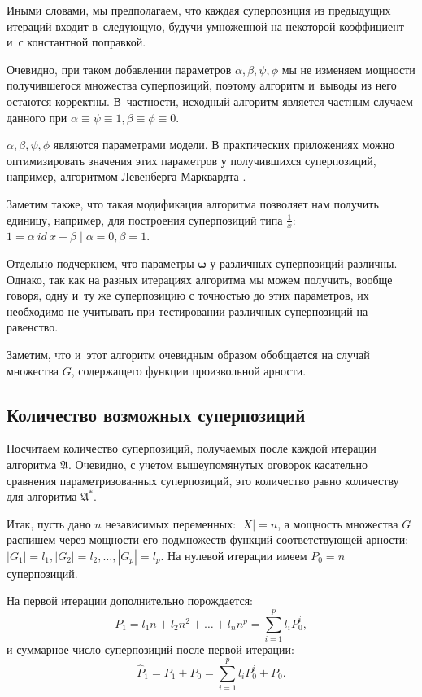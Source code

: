 \documentclass[12pt,a4paper]{amsart}
\begin{document}
Иными словами, мы предполагаем, что каждая суперпозиция из предыдущих итераций
входит в~следующую, будучи умноженной на некоторой коэффициент и~с константной
поправкой.

Очевидно, при таком добавлении параметров $\alpha, \beta, \psi, \phi$
мы не изменяем мощности получившегося множества суперпозиций, поэтому
алгоритм и~выводы из него остаются корректны. В~частности, исходный алгоритм
является частным случаем данного при
$\alpha \equiv \psi \equiv 1, \beta \equiv \phi \equiv 0$.

$\alpha, \beta, \psi, \phi$ являются параметрами модели. В
практических приложениях можно оптимизировать значения этих параметров у
получившихся суперпозиций, например, алгоритмом Левенберга-Марквардта
\cite{Marquardt1963Algorithm, more:78}.

Заметим также, что такая модификация алгоритма позволяет нам получить единицу,
например, для построения суперпозиций типа $\frac{1}{x}$:
$1 = \alpha\ id\ x + \beta \mid \alpha = 0, \beta = 1$.

Отдельно подчеркнем, что параметры $\boldsymbol{\omega}$ у различных
суперпозиций различны. Однако, так как на разных итерациях алгоритма мы
можем получить, вообще говоря, одну и~ту же суперпозицию с точностью до
этих параметров, их необходимо не учитывать при тестировании различных
суперпозиций на равенство.

Заметим, что и~этот алгоритм очевидным образом обобщается на случай
множества $G$, содержащего функции произвольной арности.

\subsection{Количество возможных суперпозиций}

Посчитаем количество суперпозиций, получаемых после каждой итерации алгоритма
$\mathfrak{A}$. Очевидно, с учетом вышеупомянутых оговорок касательно сравнения
параметризованных суперпозиций, это количество равно количеству для алгоритма
$\mathfrak{A^*}$.

Итак, пусть дано $n$ независимых переменных: $| X | = n$, а мощность
множества $G$ распишем через мощности его подмножеств функций соответствующей
арности: $| G_1 | = l_1, | G_2 | = l_2, \dots, | G_p | = l_p$. На нулевой
итерации имеем $P_0 = n$ суперпозиций.

На первой итерации дополнительно порождается:
\[
P_1 = l_1 n + l_2 n^2 + \dots + l_n n^p = \sum_{i=1}^p l_i P_0^i,
\]
и суммарное число суперпозиций после первой итерации:
\[
\hat{P}_1 = P_1 + P_0 = \sum_{i=1}^p l_i P_0^i + P_0.
\]
\end{document}
